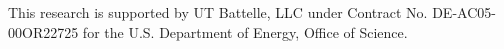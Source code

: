 \documentclass[draft]{iucr}              %
\begin{document}






This research is supported by UT Battelle, LLC under Contract No.
DE-AC05-00OR22725 for the U.S. Department of Energy, Office of Science.



     
   






\end{document}
